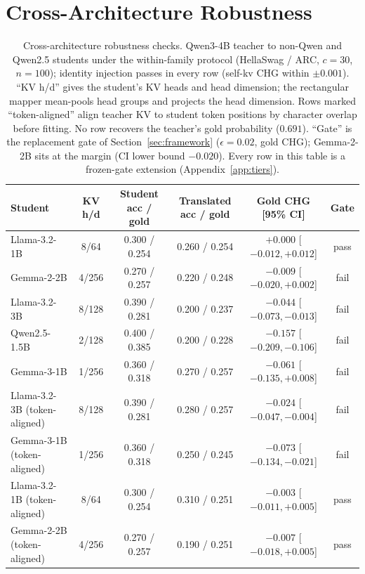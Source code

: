 \documentclass{article} %
\begin{document}
\section{Cross-Architecture Robustness}
\label{app:crossarch}

\begin{table}[t]
\centering
\caption{Cross-architecture robustness checks. Qwen3-4B teacher to non-Qwen
and Qwen2.5 students under the within-family protocol (HellaSwag / ARC,
$c{=}30$, $n{=}100$); identity injection passes in every row (self-kv CHG
within $\pm0.001$). ``KV h/d'' gives the student's KV heads and head
dimension; the rectangular mapper mean-pools head groups and projects the
head dimension. Rows marked ``token-aligned'' align teacher KV to student token
positions by character overlap before fitting. No row recovers the teacher's
gold probability ($0.691$). ``Gate'' is the replacement gate of
Section~\ref{sec:framework} ($\epsilon{=}0.02$, gold CHG); Gemma-2-2B sits at
the margin (CI lower bound $-0.020$). Every row in this table is a frozen-gate
extension (Appendix~\ref{app:tiers}).}
\label{tab:crossarch}
\scriptsize
\setlength{\tabcolsep}{3pt}
\begin{tabular}{lcccc c}
\toprule
Student & KV h/d & Student acc / gold & Translated acc / gold & Gold CHG [95\% CI] & Gate \\
\midrule
Llama-3.2-1B & 8/64 & 0.300 / 0.254 & 0.260 / 0.254 & $+0.000$ [$-0.012, +0.012$] & pass \\
Gemma-2-2B & 4/256 & 0.270 / 0.257 & 0.220 / 0.248 & $-0.009$ [$-0.020, +0.002$] & fail \\
Llama-3.2-3B & 8/128 & 0.390 / 0.281 & 0.200 / 0.237 & $-0.044$ [$-0.073, -0.013$] & fail \\
Qwen2.5-1.5B & 2/128 & 0.400 / 0.385 & 0.200 / 0.228 & $-0.157$ [$-0.209, -0.106$] & fail \\
Gemma-3-1B & 1/256 & 0.360 / 0.318 & 0.270 / 0.257 & $-0.061$ [$-0.135, +0.008$] & fail \\
\midrule
Llama-3.2-3B (token-aligned) & 8/128 & 0.390 / 0.281 & 0.280 / 0.257 & $-0.024$ [$-0.047, -0.004$] & fail \\
Gemma-3-1B (token-aligned) & 1/256 & 0.360 / 0.318 & 0.250 / 0.245 & $-0.073$ [$-0.134, -0.021$] & fail \\
Llama-3.2-1B (token-aligned) & 8/64 & 0.300 / 0.254 & 0.310 / 0.251 & $-0.003$ [$-0.011, +0.005$] & pass \\
Gemma-2-2B (token-aligned) & 4/256 & 0.270 / 0.257 & 0.190 / 0.251 & $-0.007$ [$-0.018, +0.005$] & pass \\
\bottomrule
\end{tabular}
\end{table}
\end{document}

